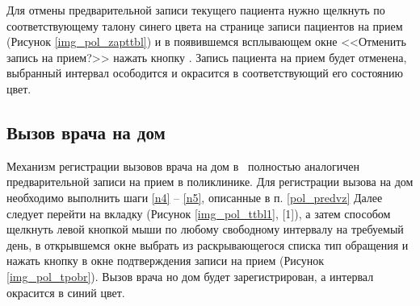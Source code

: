 Для отмены предварительной записи текущего пациента нужно щелкнуть по соответствующему талону синего цвета на странице записи пациентов на прием (Рисунок \ref{img_pol_zapttbl}) и в появившемся всплывающем окне <<Отменить запись на прием?>> нажать кнопку . Запись пациента на прием будет отменена, выбранный интервал осободится и окрасится в соответствующий его состоянию цвет.

\subsection{Вызов врача на дом} \label{pol_home}

Механизм регистрации вызовов врача на дом в \tmis~полностью аналогичен предварительной записи на прием в поликлинике. Для регистрации вызова на дом необходимо выполнить шаги \ref{n4} -- \ref{n5}, описанные в п. \ref{pol_predvz} Далее следует перейти на вкладку  (Рисунок \ref{img_pol_ttbl1}, [1]), а затем способом щелкнуть левой кнопкой мыши по любому свободному интервалу на требуемый день, в открывшемся окне выбрать из раскрывающегося списка тип обращения и нажать кнопку  в окне подтверждения записи на прием (Рисунок \ref{img_pol_tpobr}). Вызов врача но дом будет зарегистрирован, а интервал окрасится в синий цвет.
